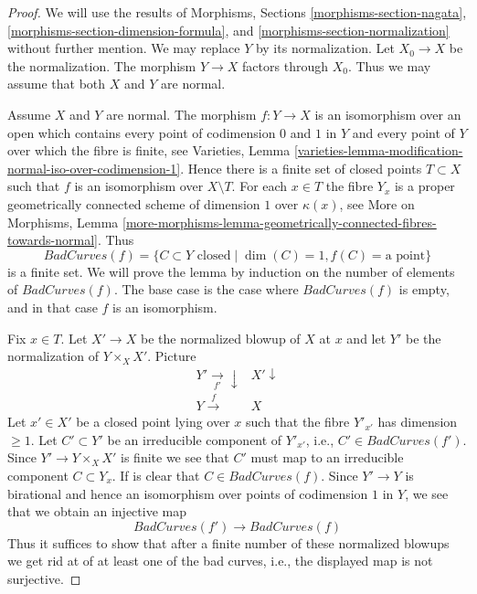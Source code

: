 \begin{proof}
We will use the results of Morphisms, Sections
\ref{morphisms-section-nagata},
\ref{morphisms-section-dimension-formula}, and
\ref{morphisms-section-normalization} without further mention.
We may replace $Y$ by its normalization. Let $X_0 \to X$
be the normalization. The morphism $Y \to X$ factors through $X_0$.
Thus we may assume that both $X$ and $Y$ are normal.

\medskip\noindent
Assume $X$ and $Y$ are normal. The morphism $f : Y \to X$ is an isomorphism
over an open which contains every point of codimension $0$ and $1$ in $Y$ and
every point of $Y$ over which the fibre is finite, see Varieties, Lemma
\ref{varieties-lemma-modification-normal-iso-over-codimension-1}.
Hence there is a finite set of closed points $T \subset X$
such that $f$ is an isomorphism over $X \setminus T$. For each $x \in T$
the fibre $Y_x$ is a proper geometrically connected scheme of dimension $1$
over $\kappa(x)$, see
More on Morphisms, Lemma
\ref{more-morphisms-lemma-geometrically-connected-fibres-towards-normal}.
Thus
$$
BadCurves(f) = \{C \subset Y\text{ closed} \mid
\dim(C) = 1, f(C) = \text{a point}\}
$$
is a finite set. We will prove the lemma by induction on the number
of elements of $BadCurves(f)$. The base case is the case where $BadCurves(f)$
is empty, and in that case $f$ is an isomorphism.

\medskip\noindent
Fix $x \in T$. Let $X' \to X$ be the normalized blowup of $X$ at $x$ and let
$Y'$ be the normalization of $Y \times_X X'$. Picture
$$
\begin{array}{cc}Y' \underset{f'}{\longrightarrow}\downarrow & X' \downarrow \\ Y \overset{f}{\longrightarrow} & X\end{array}
$$
Let $x' \in X'$ be a closed point lying over $x$ such that
the fibre $Y'_{x'}$ has dimension $\geq 1$. Let $C' \subset Y'$
be an irreducible component of $Y'_{x'}$, i.e., $C' \in BadCurves(f')$.
Since $Y' \to Y \times_X X'$ is finite we see that $C'$ must map
to an irreducible component $C \subset Y_x$.
If is clear that $C \in BadCurves(f)$.
Since $Y' \to Y$ is birational and hence an isomorphism over points of
codimension $1$ in $Y$, we see that we obtain an injective map
$$
BadCurves(f') \longrightarrow BadCurves(f)
$$
Thus it suffices to show that after a finite number of these
normalized blowups we get rid at of at least one of the bad
curves, i.e., the displayed map is not surjective.


\end{proof}
